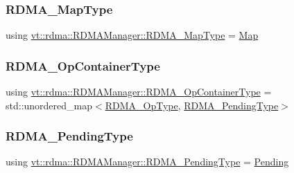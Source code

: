 \subsubsection{\texorpdfstring{R\+D\+M\+A\+\_\+\+Map\+Type}{RDMA\_MapType}}
{\footnotesize\ttfamily using \hyperlink{structvt_1_1rdma_1_1_r_d_m_a_manager_a16e12d11cf7d771df0d3dc6947a4f95c}{vt\+::rdma\+::\+R\+D\+M\+A\+Manager\+::\+R\+D\+M\+A\+\_\+\+Map\+Type} =  \hyperlink{structvt_1_1rdma_1_1_map}{Map}}

\mbox{\label{structvt_1_1rdma_1_1_r_d_m_a_manager_a8c9def755fab6d3eb1f529175243f38a}} 
\subsubsection{\texorpdfstring{R\+D\+M\+A\+\_\+\+Op\+Container\+Type}{RDMA\_OpContainerType}}
{\footnotesize\ttfamily using \hyperlink{structvt_1_1rdma_1_1_r_d_m_a_manager_a8c9def755fab6d3eb1f529175243f38a}{vt\+::rdma\+::\+R\+D\+M\+A\+Manager\+::\+R\+D\+M\+A\+\_\+\+Op\+Container\+Type} =  std\+::unordered\+\_\+map$<$\hyperlink{namespacevt_1_1rdma_a9b966d9780a2b41afe7cd7b7b4b20300}{R\+D\+M\+A\+\_\+\+Op\+Type}, \hyperlink{structvt_1_1rdma_1_1_r_d_m_a_manager_a1239149a2070897c56e94e65c2016a7a}{R\+D\+M\+A\+\_\+\+Pending\+Type}$>$}

\mbox{\label{structvt_1_1rdma_1_1_r_d_m_a_manager_a1239149a2070897c56e94e65c2016a7a}} 
\subsubsection{\texorpdfstring{R\+D\+M\+A\+\_\+\+Pending\+Type}{RDMA\_PendingType}}
{\footnotesize\ttfamily using \hyperlink{structvt_1_1rdma_1_1_r_d_m_a_manager_a1239149a2070897c56e94e65c2016a7a}{vt\+::rdma\+::\+R\+D\+M\+A\+Manager\+::\+R\+D\+M\+A\+\_\+\+Pending\+Type} =  \hyperlink{structvt_1_1rdma_1_1_pending}{Pending}}

